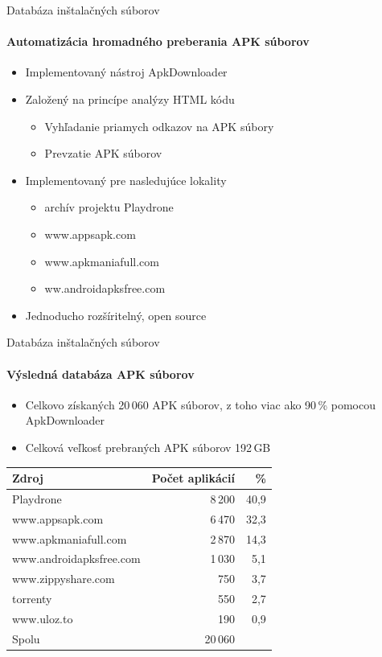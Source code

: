 \documentclass{beamer}
\begin{document}
  \begin{frame}[label=lists]{Databáza inštalačných súborov}
    \framesubtitle{Automatizácia hromadného preberania APK súborov}
    \begin{itemize}
  		\item Implementovaný nástroj ApkDownloader\cite{apkdownloader}
  		\item Založený na princípe analýzy HTML kódu
  		\begin{itemize}
  		\item Vyhľadanie priamych odkazov na APK súbory
  		\item Prevzatie APK súborov
  		\end{itemize}
		\item Implementovaný pre nasledujúce lokality
  		\begin{itemize}
  			\item archív projektu Playdrone
	  		\item www.appsapk.com
  			\item www.apkmaniafull.com
  			\item ww.androidapksfree.com
  		\end{itemize}
  		\item Jednoducho rozšíritelný, open source
    \end{itemize}  
  \end{frame}  
  
  \begin{frame}[label=lists]{Databáza inštalačných súborov}
    \framesubtitle{Výsledná databáza APK súborov}
	\begin{itemize}
	\item Celkovo získaných 20\,060 APK súborov, z toho viac ako 90\,\% pomocou ApkDownloader
		\item Celková veľkosť prebraných APK súborov 192\,GB
\end{itemize}	    
    
    \begin{table}[htb]
\centering
  \begin{tabular}{l r r}
    
    \textbf{Zdroj} & \textbf{Počet aplikácií} & \textbf{\%} \\\hline
    Playdrone & 8\,200 & 40,9\\
    www.appsapk.com & 6\,470 & 32,3\\
    www.apkmaniafull.com & 2\,870 & 14,3\\
    www.androidapksfree.com & 1\,030 & 5,1\\
    www.zippyshare.com & 750 & 3,7\\
    torrenty & 550 & 2,7\\
    www.uloz.to & 190 & 0,9\\
    \hline
    Spolu & 20\,060 & \\
  \end{tabular}
  \label{tab:stahovanie}
\end{table}
  
\end{frame}  
  
\end{document}
